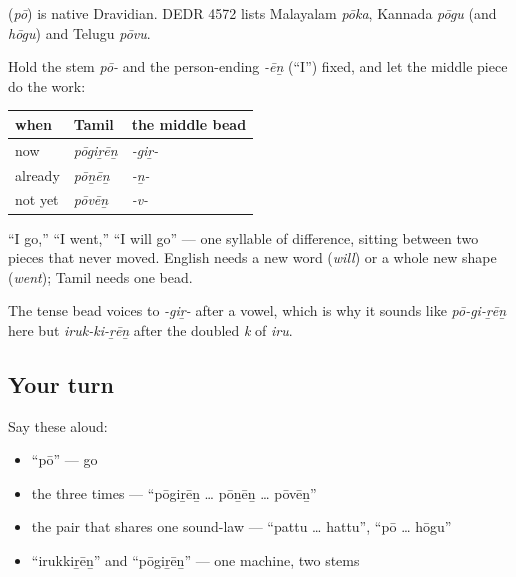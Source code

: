 \begin{cousinweb}
\textbf{} (\emph{pō}) is native Dravidian. DEDR 4572 lists Malayalam \emph{pōka}, Kannada \emph{pōgu} (and \emph{hōgu}) and Telugu \emph{pōvu}.
\end{cousinweb}

\begin{grammarlens}[title={Grammar Lens: past, present, future — one bead each}]
Hold the stem \emph{pō-} and the person-ending \emph{-ēṉ} (\textquotedblleft{}I\textquotedblright{}) fixed, and let the middle piece do the work:

\noindent
\begin{tabularx}{\linewidth}{@{}>{\raggedright\arraybackslash}X>{\raggedright\arraybackslash}X>{\raggedright\arraybackslash}X@{}}
\toprule
\textbf{when} & \textbf{Tamil} & \textbf{the middle bead} \\
\midrule
now & \emph{pōgiṟēṉ} & \emph{-giṟ-} \\
already & \emph{pōṉēṉ} & \emph{-ṉ-} \\
not yet & \emph{pōvēṉ} & \emph{-v-} \\
\bottomrule
\end{tabularx}

\textquotedblleft{}I go,\textquotedblright{} \textquotedblleft{}I went,\textquotedblright{} \textquotedblleft{}I will go\textquotedblright{} — one syllable of difference, sitting between two pieces that never moved. English needs a new word (\emph{will}) or a whole new shape (\emph{went}); Tamil needs one bead.

The tense bead voices to \emph{-giṟ-} after a vowel, which is why it sounds like \emph{pō-gi-ṟēṉ} here but \emph{iruk-ki-ṟēṉ} after the doubled \emph{k} of \emph{iru}.
\end{grammarlens}

\subsection*{Your turn}
Say these aloud:

\begin{itemize}
\raggedright
  \item \textquotedblleft{}pō\textquotedblright{} — go
  \item the three times — \textquotedblleft{}pōgiṟēṉ … pōṉēṉ … pōvēṉ\textquotedblright{}
  \item the pair that shares one sound-law — \textquotedblleft{}pattu … hattu\textquotedblright{}, \textquotedblleft{}pō … hōgu\textquotedblright{}
  \item \textquotedblleft{}irukkiṟēṉ\textquotedblright{} and \textquotedblleft{}pōgiṟēṉ\textquotedblright{} — one machine, two stems
\end{itemize}

